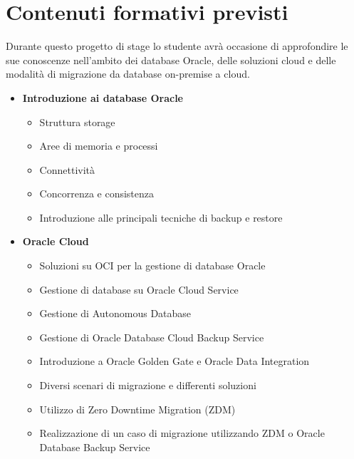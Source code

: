 \section*{Contenuti formativi previsti}
Durante questo progetto di stage lo studente avrà occasione di approfondire le sue conoscenze nell'ambito dei database Oracle, delle soluzioni cloud e delle modalità di migrazione da database on-premise a cloud.

\begin{itemize}
    \item \textbf{Introduzione ai database Oracle}
    \begin{itemize}
        \item Struttura storage
        \item Aree di memoria e processi
        \item Connettività
        \item Concorrenza e consistenza
        \item Introduzione alle principali tecniche di backup e restore
    \end{itemize}
    \item \textbf{Oracle Cloud}
    \begin{itemize}
        \item Soluzioni su OCI per la gestione di database Oracle
        \item Gestione di database su Oracle Cloud Service
        \item Gestione di Autonomous Database
        \item Gestione di Oracle Database Cloud Backup Service
        \item Introduzione a Oracle Golden Gate e Oracle Data Integration
        \item Diversi scenari di migrazione e differenti soluzioni
        \item Utilizzo di Zero Downtime Migration (ZDM)
        \item Realizzazione di un caso di migrazione utilizzando ZDM o Oracle Database Backup Service
    \end{itemize}
\end{itemize}


\newpage
